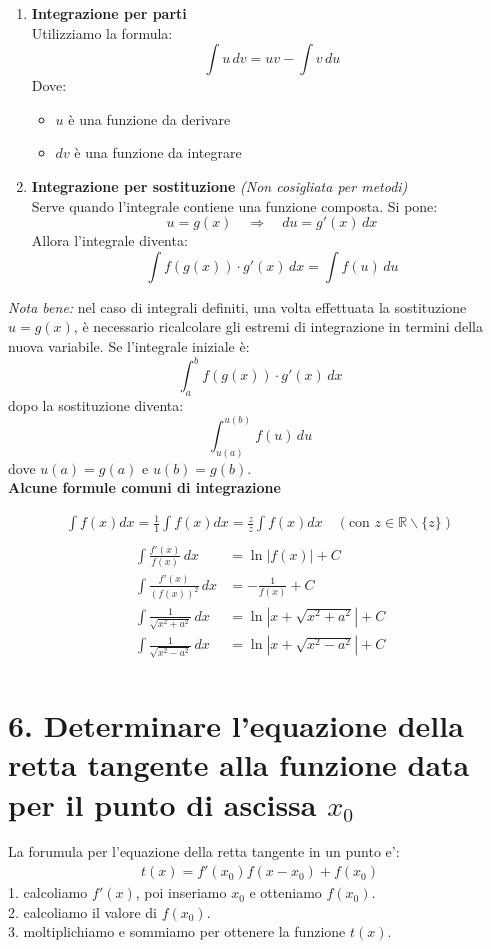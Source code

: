 \documentclass{article}
\begin{document}
\begin{enumerate}
    \item \textbf{Integrazione per parti} \\
    Utilizziamo la formula:
    \[
    \int u \, dv = uv - \int v \, du
    \]
    Dove:
    \begin{itemize}
        \item \( u \) è una funzione da derivare
        \item \( dv \) è una funzione da integrare
    \end{itemize}

    \item \textbf{Integrazione per sostituzione} \textit{(Non cosigliata per metodi)}\\
    Serve quando l'integrale contiene una funzione composta. Si pone:
    \[
    u = g(x) \quad \Rightarrow \quad du = g'(x)\, dx
    \]
    Allora l'integrale diventa:
    \[
    \int f(g(x)) \cdot g'(x) \, dx = \int f(u) \, du
    \]
\end{enumerate}
\textit{Nota bene:} nel caso di integrali definiti, una volta effettuata la sostituzione \( u = g(x) \), è necessario ricalcolare gli estremi di integrazione in termini della nuova variabile. Se l'integrale iniziale è:
\[
\int_a^b f(g(x)) \cdot g'(x) \, dx
\]
dopo la sostituzione diventa:
\[
\int_{u(a)}^{u(b)} f(u) \, du
\]
dove \( u(a) = g(a) \) e \( u(b) = g(b) \). \\
\textbf{Alcune formule comuni di integrazione}

\begin{align*}
    \int f(x)dx = \frac{1}{1} \int f(x)dx = \frac{z}{z} \int f(x)dx \quad (\text{con }z\in \mathbb{R}\backslash \{z\}) \\
\end{align*}
\begin{align*}
    \int \frac{f'(x)}{f(x)} \, dx &= \ln|f(x)| + C \\
    \int \frac{f'(x)}{(f(x))^2} \, dx &= -\frac{1}{f(x)} + C \\
    \int \frac{1}{\sqrt{x^2 + a^2}} \, dx &= \ln \left| x + \sqrt{x^2 + a^2} \right| + C \\
    \int \frac{1}{\sqrt{x^2 - a^2}} \, dx &= \ln \left| x + \sqrt{x^2 - a^2} \right| + C \\
\end{align*}

\pagebreak
\section*{6. Determinare l’equazione della retta tangente alla funzione data per il punto di ascissa $x_0$}
La forumula per l'equazione della retta tangente in un punto e':
\begin{align*}
    t(x)=f'(x_0)f(x-x_0)+f(x_0)
\end{align*}
1. calcoliamo $f'(x)$, poi inseriamo $x_0$ e otteniamo $f(x_0)$. \\
2. calcoliamo il valore di $f(x_0)$. \\
3. moltiplichiamo e sommiamo per ottenere la funzione $t(x)$.
\end{document}
